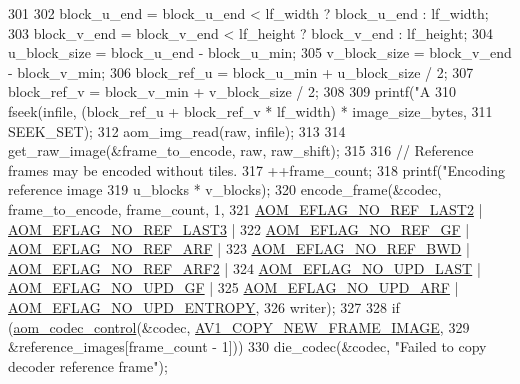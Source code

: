\begin{DoxyCodeInclude}
{{{{{301 
302       block\_u\_end = block\_u\_end < lf\_width ? block\_u\_end : lf\_width;
303       block\_v\_end = block\_v\_end < lf\_height ? block\_v\_end : lf\_height;
304       u\_block\_size = block\_u\_end - block\_u\_min;
305       v\_block\_size = block\_v\_end - block\_v\_min;
306       block\_ref\_u = block\_u\_min + u\_block\_size / 2;
307       block\_ref\_v = block\_v\_min + v\_block\_size / 2;
308 
309       printf(\textcolor{stringliteral}{"A%
310       fseek(infile, (block\_ref\_u + block\_ref\_v * lf\_width) * image\_size\_bytes,
311             SEEK\_SET);
312       aom\_img\_read(raw, infile);
313 
314       get\_raw\_image(&frame\_to\_encode, raw, raw\_shift);
315 
316       \textcolor{comment}{// Reference frames may be encoded without tiles.}
317       ++frame\_count;
318       printf(\textcolor{stringliteral}{"Encoding reference image %
319              u\_blocks * v\_blocks);
320       encode\_frame(&codec, frame\_to\_encode, frame\_count, 1,
321                    \hyperlink{group__aom__encoder_ga50c2560ca6670298cfc614ecae96a391}{AOM\_EFLAG\_NO\_REF\_LAST2} | 
      \hyperlink{group__aom__encoder_gaa4bc8ae2b977b73f0ef57ba428ca1d2c}{AOM\_EFLAG\_NO\_REF\_LAST3} |
322                        \hyperlink{group__aom__encoder_gaaef6fe76991abf87edd2f296eee999f8}{AOM\_EFLAG\_NO\_REF\_GF} | 
      \hyperlink{group__aom__encoder_ga9e2f989737d63ddf4e987a525d186a46}{AOM\_EFLAG\_NO\_REF\_ARF} |
323                        \hyperlink{group__aom__encoder_ga758649aa6cd9fefb15ad888489884a38}{AOM\_EFLAG\_NO\_REF\_BWD} | 
      \hyperlink{group__aom__encoder_gad04799a74215e1b9609f7ccd1766f8c9}{AOM\_EFLAG\_NO\_REF\_ARF2} |
324                        \hyperlink{group__aom__encoder_ga7a55a46970c074b761319c5c46d87b6e}{AOM\_EFLAG\_NO\_UPD\_LAST} | 
      \hyperlink{group__aom__encoder_gaa81cc31f95fd463f51a158050d267a36}{AOM\_EFLAG\_NO\_UPD\_GF} |
325                        \hyperlink{group__aom__encoder_ga469b4cf5ff76cb30de951e129c25a786}{AOM\_EFLAG\_NO\_UPD\_ARF} | 
      \hyperlink{group__aom__encoder_gac5a69f04b0bc88f755587a1da815d754}{AOM\_EFLAG\_NO\_UPD\_ENTROPY},
326                    writer);
327 
328       \textcolor{keywordflow}{if} (\hyperlink{group__codec_ga6da974f4eeaba1fa74106b28d0fe6ac5}{aom\_codec\_control}(&codec, \hyperlink{group__aom_gga9421a1fa78c0d9587ae5aa6c1cb3d659ae41763622ee33cd99e23ca8f78a3f8fa}{AV1\_COPY\_NEW\_FRAME\_IMAGE},
329                             &reference\_images[frame\_count - 1]))
330         die\_codec(&codec, \textcolor{stringliteral}{"Failed to copy decoder reference frame"});
}}}}}}}
\end{DoxyCodeInclude}
